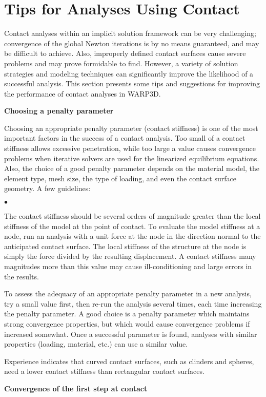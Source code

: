 \documentclass[11pt]{report}
\numberwithin{equation}{section}
\newcommand{\noi}{\noindent}
\newcommand{\squishlist}{
 \begin{list}{$\bullet$}
  { \setlength{\itemsep}{0pt}
     \setlength{\parsep}{3pt}
     \setlength{\topsep}{3pt}
     \setlength{\partopsep}{0pt}
     \setlength{\leftmargin}{1.5em}
     \setlength{\labelwidth}{1em}
     \setlength{\labelsep}{0.5em} } }
\newcommand{\squishend}{
  \end{list}  }
\begin{document}
\section{Tips for Analyses Using Contact}

Contact analyses within an implicit solution framework
can be very challenging; convergence of the global Newton iterations
is by no means 
guaranteed, and may be difficult to achieve. Also, improperly defined 
contact surfaces cause severe problems and may prove formidable to find. 
However, a variety of solution strategies and modeling techniques can 
significantly improve the likelihood of a successful analysis. This 
section presents some tips and suggestions for improving the 
performance of contact analyses in WARP3D. 

\noindent \bf{Choosing a penalty parameter}\rm

\noi Choosing an appropriate penalty parameter (contact stiffness) 
is one of the most important factors in the success of a contact analysis. 
Too small of a contact stiffness allows excessive penetration, 
while too large a value causes convergence 
problems when iterative solvers are used for the linearized
equilibrium equations. Also, the choice 
of a good penalty parameter depends on the material model, the element 
type, mesh size, the type of loading, and even the contact surface geometry. 
A few guidelines:
\small
\squishlist
\item The contact stiffness should be several orders of magnitude 
greater than the local stiffness of the model at the point of 
contact. To evaluate the model stiffness at a node, run an 
analysis with a unit force at the node in the direction
normal to the anticipated 
contact surface. The local stiffness of the structure at the node 
is simply the force divided by the resulting displacement. A contact 
stiffness many magnitudes more than this value may cause 
ill-conditioning and large errors in the results. 
\item To assess the adequacy of an appropriate penalty parameter 
in a new analysis, try a small value first, then re-run the analysis 
several times, each time increasing the penalty parameter. A good 
choice is a penalty parameter which maintains strong convergence 
properties, but which would cause convergence problems if increased 
somewhat. Once a successful parameter is found, analyses with 
similar properties (loading, material, etc.) can use a similar value.
\item Experience indicates that curved contact surfaces, such as 
clinders and spheres, need a lower contact stiffness than rectangular contact surfaces.
\squishend
\normalsize
\noindent \bf{Convergence of the first step at contact}\rm
\end{document}
